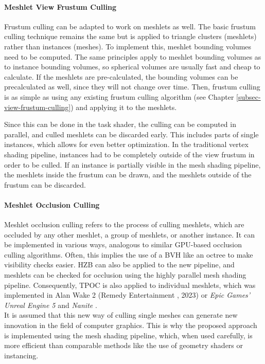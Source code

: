 \paragraph*{Meshlet View Frustum Culling} \label{subsubsec-meshlet-view-frustum-culling}

Frustum culling can be adapted to work on meshlets as well. The basic frustum culling technique remains the same but 
is applied to triangle clusters (meshlets) rather than instances (meshes). To implement this, meshlet bounding volumes 
need to be computed. The same principles apply to meshlet bounding volumes as to instance bounding volumes, so spherical 
volumes are usually fast and cheap to calculate. If the meshlets are pre-calculated, the bounding volumes can be 
precalculated as well, since they will not change over time. Then, frustum culling is as simple as using any existing 
frustum culling algorithm (see Chapter \ref{subsec-view-frustum-culling}) and applying it to the meshlets. \\

\clearpage

\noindent
Since this can be done in the task shader, the culling can be computed in parallel, and culled meshlets can 
be discarded early. This includes parts of single instances, which allows for even better optimization. In 
the traditional vertex shading pipeline, instances had to be completely outside of the view frustum in order 
to be culled. If an instance is partially visible in the mesh shading pipeline, the meshlets inside the frustum 
can be drawn, and the meshlets outside of the frustum can be discarded.


\paragraph*{Meshlet Occlusion Culling} \label{subsubsec-meshlet-occlusion-culling}

Meshlet occlusion culling refers to the process of culling meshlets, which are occluded by any other meshlet, a 
group of meshlets, or another instance. It can be implemented in various ways, analogous to similar \ac{GPU}-based 
occlusion culling algorithms. Often, this implies the use of a \ac{BVH} like an octree to make visibility checks 
easier. \ac{HZB} can also be applied to the new pipeline, and meshlets can be checked for occlusion using the 
highly parallel mesh shading pipeline. Consequently, \ac{TPOC} is also applied to individual meshlets, which was 
implemented in Alan Wake 2 (Remedy Entertainment \cite{Remedy2023}, 2023) or \emph{Epic Games'} \emph{Unreal Engine 5} and 
\emph{Nanite} \cite{Karis2021}. \\

\noindent
It is assumed that this new way of culling single meshes can generate new innovation in the field of computer graphics.
This is why the proposed approach is implemented using the mesh shading pipeline, which, when used carefully, is more 
efficient than comparable methods like the use of geometry shaders or instancing.